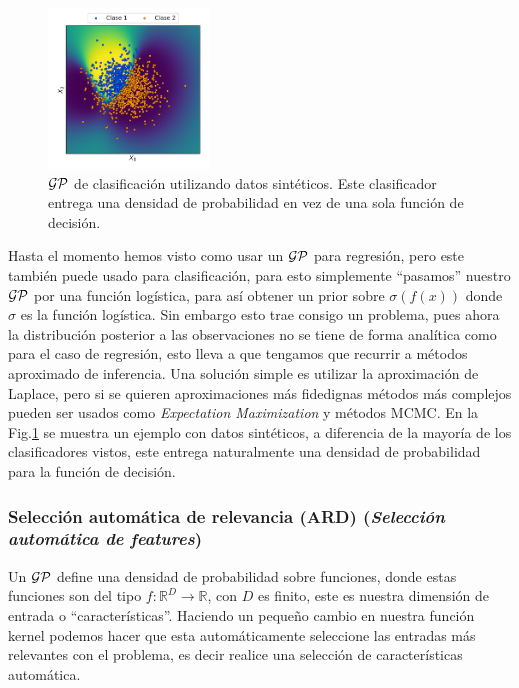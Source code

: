 \begin{figure}
\includegraphics[width=0.38\textwidth]{img/gp_classifi.pdf}
\caption{$\mathcal{GP}$ de clasificación utilizando datos sintéticos. Este clasificador entrega una densidad de probabilidad en vez de una sola función de decisión.}\label{fig:gp_8}
\end{figure} 

Hasta el momento hemos visto como usar un $\mathcal{GP}$ para regresión, pero este también puede usado para clasificación, para esto simplemente ``pasamos'' nuestro $\mathcal{GP}$ por una función logística, para así obtener un prior sobre $\sigma\left(f(x)\right)$ donde $\sigma$ es la función logística. Sin embargo esto trae consigo un problema, pues ahora la distribución posterior a las observaciones no se tiene de forma analítica como para el caso de regresión, esto lleva a que tengamos que recurrir a métodos aproximado de inferencia. Una solución simple es utilizar la aproximación de Laplace, pero si se quieren aproximaciones más fidedignas métodos más complejos pueden ser usados como \textit{Expectation Maximization} y métodos MCMC. En la Fig.\ref{fig:gp_8} se muestra un ejemplo con datos sintéticos, a diferencia de la mayoría de los clasificadores vistos, este entrega naturalmente una densidad de probabilidad para la función de decisión.\\



\subsubsection{Selección automática de relevancia (ARD) (\textit{Selección automática de features})}
Un $\mathcal{GP}$ define una densidad de probabilidad sobre funciones, donde estas funciones son del tipo $f: \mathbb{R}^D \rightarrow \mathbb{R}$, con $D$ es finito, este es nuestra dimensión de entrada o ``características''. Haciendo un pequeño cambio en nuestra función kernel podemos hacer que esta automáticamente seleccione las entradas más relevantes con el problema, es decir realice una selección de características automática.\\


